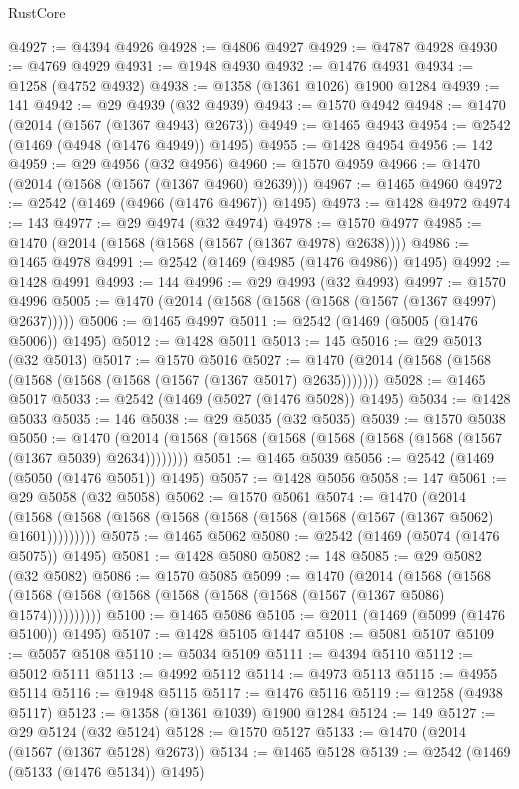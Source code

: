 \begin{lexlean}{RustCore}
\begin{coremodule}
@4927 := @4394 @4926
@4928 := @4806 @4927
@4929 := @4787 @4928
@4930 := @4769 @4929
@4931 := @1948 @4930
@4932 := @1476 @4931
@4934 := @1258 (@4752 @4932)
@4938 := @1358 (@1361 @1026) @1900 @1284
@4939 := 141
@4942 := @29 @4939 (@32 @4939)
@4943 := @1570 @4942
@4948 := @1470 (@2014 (@1567 (@1367 @4943) @2673))
@4949 := @1465 @4943
@4954 := @2542 (@1469 (@4948 (@1476 @4949)) @1495)
@4955 := @1428 @4954
@4956 := 142
@4959 := @29 @4956 (@32 @4956)
@4960 := @1570 @4959
@4966 := @1470 (@2014 (@1568 (@1567 (@1367 @4960) @2639)))
@4967 := @1465 @4960
@4972 := @2542 (@1469 (@4966 (@1476 @4967)) @1495)
@4973 := @1428 @4972
@4974 := 143
@4977 := @29 @4974 (@32 @4974)
@4978 := @1570 @4977
@4985 := @1470 (@2014 (@1568 (@1568 (@1567 (@1367 @4978) @2638))))
@4986 := @1465 @4978
@4991 := @2542 (@1469 (@4985 (@1476 @4986)) @1495)
@4992 := @1428 @4991
@4993 := 144
@4996 := @29 @4993 (@32 @4993)
@4997 := @1570 @4996
@5005 := @1470 (@2014 (@1568 (@1568 (@1568 (@1567 (@1367 @4997) @2637)))))
@5006 := @1465 @4997
@5011 := @2542 (@1469 (@5005 (@1476 @5006)) @1495)
@5012 := @1428 @5011
@5013 := 145
@5016 := @29 @5013 (@32 @5013)
@5017 := @1570 @5016
@5027 := @1470 (@2014 (@1568 (@1568 (@1568 (@1568 (@1568 (@1567 (@1367 @5017) @2635)))))))
@5028 := @1465 @5017
@5033 := @2542 (@1469 (@5027 (@1476 @5028)) @1495)
@5034 := @1428 @5033
@5035 := 146
@5038 := @29 @5035 (@32 @5035)
@5039 := @1570 @5038
@5050 := @1470 (@2014 (@1568 (@1568 (@1568 (@1568 (@1568 (@1568 (@1567 (@1367 @5039) @2634))))))))
@5051 := @1465 @5039
@5056 := @2542 (@1469 (@5050 (@1476 @5051)) @1495)
@5057 := @1428 @5056
@5058 := 147
@5061 := @29 @5058 (@32 @5058)
@5062 := @1570 @5061
@5074 := @1470
    (@2014 (@1568 (@1568 (@1568 (@1568 (@1568 (@1568 (@1568 (@1567 (@1367 @5062) @1601)))))))))
@5075 := @1465 @5062
@5080 := @2542 (@1469 (@5074 (@1476 @5075)) @1495)
@5081 := @1428 @5080
@5082 := 148
@5085 := @29 @5082 (@32 @5082)
@5086 := @1570 @5085
@5099 := @1470
    (@2014
      (@1568 (@1568 (@1568 (@1568 (@1568 (@1568 (@1568 (@1568 (@1567 (@1367 @5086) @1574))))))))))
@5100 := @1465 @5086
@5105 := @2011 (@1469 (@5099 (@1476 @5100)) @1495)
@5107 := @1428 @5105 @1447
@5108 := @5081 @5107
@5109 := @5057 @5108
@5110 := @5034 @5109
@5111 := @4394 @5110
@5112 := @5012 @5111
@5113 := @4992 @5112
@5114 := @4973 @5113
@5115 := @4955 @5114
@5116 := @1948 @5115
@5117 := @1476 @5116
@5119 := @1258 (@4938 @5117)
@5123 := @1358 (@1361 @1039) @1900 @1284
@5124 := 149
@5127 := @29 @5124 (@32 @5124)
@5128 := @1570 @5127
@5133 := @1470 (@2014 (@1567 (@1367 @5128) @2673))
@5134 := @1465 @5128
@5139 := @2542 (@1469 (@5133 (@1476 @5134)) @1495)

\end{coremodule}
\end{lexlean}
